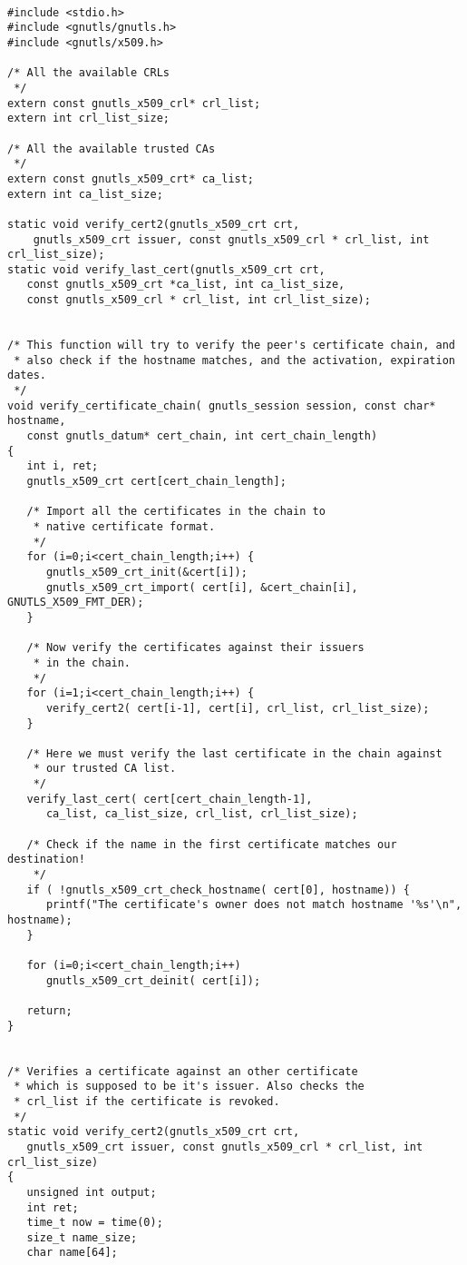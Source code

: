 \label{ex:verify-chain}

\begin{verbatim}

#include <stdio.h>
#include <gnutls/gnutls.h>
#include <gnutls/x509.h>

/* All the available CRLs
 */
extern const gnutls_x509_crl* crl_list;
extern int crl_list_size;

/* All the available trusted CAs
 */
extern const gnutls_x509_crt* ca_list;
extern int ca_list_size;

static void verify_cert2(gnutls_x509_crt crt,
	gnutls_x509_crt issuer, const gnutls_x509_crl * crl_list, int crl_list_size);
static void verify_last_cert(gnutls_x509_crt crt,
   const gnutls_x509_crt *ca_list, int ca_list_size,
   const gnutls_x509_crl * crl_list, int crl_list_size);


/* This function will try to verify the peer's certificate chain, and
 * also check if the hostname matches, and the activation, expiration dates.
 */
void verify_certificate_chain( gnutls_session session, const char* hostname,
   const gnutls_datum* cert_chain, int cert_chain_length)
{
   int i, ret;
   gnutls_x509_crt cert[cert_chain_length];

   /* Import all the certificates in the chain to
    * native certificate format.
    */
   for (i=0;i<cert_chain_length;i++) {
      gnutls_x509_crt_init(&cert[i]);
      gnutls_x509_crt_import( cert[i], &cert_chain[i], GNUTLS_X509_FMT_DER);
   }

   /* Now verify the certificates against their issuers
    * in the chain.
    */   
   for (i=1;i<cert_chain_length;i++) {
      verify_cert2( cert[i-1], cert[i], crl_list, crl_list_size);
   }

   /* Here we must verify the last certificate in the chain against
    * our trusted CA list.
    */
   verify_last_cert( cert[cert_chain_length-1], 
      ca_list, ca_list_size, crl_list, crl_list_size);

   /* Check if the name in the first certificate matches our destination!
    */
   if ( !gnutls_x509_crt_check_hostname( cert[0], hostname)) {
      printf("The certificate's owner does not match hostname '%s'\n", hostname);
   }

   for (i=0;i<cert_chain_length;i++)
      gnutls_x509_crt_deinit( cert[i]);

   return;
}


/* Verifies a certificate against an other certificate
 * which is supposed to be it's issuer. Also checks the
 * crl_list if the certificate is revoked.
 */
static void verify_cert2(gnutls_x509_crt crt,
   gnutls_x509_crt issuer, const gnutls_x509_crl * crl_list, int crl_list_size)
{ 
   unsigned int output;
   int ret;
   time_t now = time(0);
   size_t name_size;
   char name[64];


\end{verbatim}

